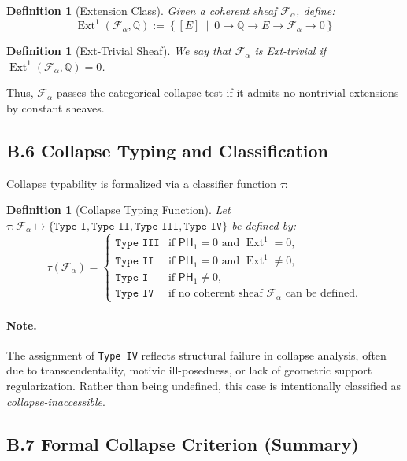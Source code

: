 \documentclass[11pt]{article}
\newtheorem{definition}[theorem]{Definition}
\DeclareMathOperator{\Ext}{Ext}
\begin{document}
\begin{definition}[Extension Class]
Given a coherent sheaf $\mathcal{F}_\alpha$, define:
\[
\Ext^1(\mathcal{F}_\alpha, \mathbb{Q}) := \left\{ [E] \ \middle| \ 0 \to \mathbb{Q} \to E \to \mathcal{F}_\alpha \to 0 \right\}
\]
\end{definition}

\begin{definition}[Ext-Trivial Sheaf]
We say that $\mathcal{F}_\alpha$ is \emph{Ext-trivial} if $\Ext^1(\mathcal{F}_\alpha, \mathbb{Q}) = 0$.
\end{definition}

Thus, $\mathcal{F}_\alpha$ passes the categorical collapse test if it admits no nontrivial extensions by constant sheaves.

\subsection*{B.6 Collapse Typing and Classification}

Collapse typability is formalized via a classifier function $\tau$:

\begin{definition}[Collapse Typing Function]
Let $\tau: \mathcal{F}_\alpha \mapsto \{ \texttt{Type I}, \texttt{Type II}, \texttt{Type III}, \texttt{Type IV} \}$ be defined by:
\[
\tau(\mathcal{F}_\alpha) =
\begin{cases}
\texttt{Type III} & \text{if } \mathsf{PH}_1 = 0 \text{ and } \Ext^1 = 0, \\
\texttt{Type II} & \text{if } \mathsf{PH}_1 = 0 \text{ and } \Ext^1 \ne 0, \\
\texttt{Type I} & \text{if } \mathsf{PH}_1 \ne 0, \\
\texttt{Type IV} & \text{if no coherent sheaf $\mathcal{F}_\alpha$ can be defined}.
\end{cases}
\]
\end{definition}

\paragraph{Note.}
The assignment of \texttt{Type IV} reflects structural failure in collapse analysis, often due to transcendentality, motivic ill-posedness, or lack of geometric support regularization. Rather than being undefined, this case is intentionally classified as \emph{collapse-inaccessible}.

\subsection*{B.7 Formal Collapse Criterion (Summary)}
\end{document}
